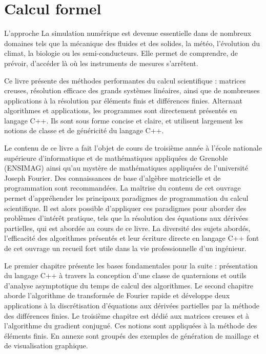 \documentclass[11pt,fleqn]{book} %
\begin{document}
\chapter{Calcul formel}

L'approche La simulation numérique est devenue essentielle dans de nombreux domaines tels que la mécanique des fluides et des solides, la météo, l'évolution du climat, la biologie ou les semi-conducteurs. Elle permet de comprendre, de prévoir, d'accéder là où les instruments de mesures s'arrêtent. 

Ce livre présente des méthodes performantes du calcul scientifique : matrices creuses, résolution efficace des grands systèmes linéaires, ainsi que de nombreuses applications à la résolution par éléments finis et différences finies. Alternant algorithmes et applications, les programmes sont directement présentés en langage C++. Ils sont sous forme concise et claire, et utilisent largement les notions de classe et de généricité du langage C++. 

Le contenu de ce livre a fait l'objet de cours de troisième année à l'école nationale supérieure d'informatique et de mathématiques appliquées de Grenoble (ENSIMAG) ainsi qu'au mystère de mathématiques appliquées de l'université Joseph Fourier. Des connaissances de base d'algèbre matricielle et de programmation sont recommandées. La maîtrise du contenu de cet ouvrage permet d'appréhender les principaux paradigmes de programmation du calcul scientifique. Il est alors possible d'appliquer ces paradigmes pour aborder des problèmes d'intérêt pratique, tels que la résolution des équations aux dérivées partielles, qui est abordée au cours de ce livre. La diversité des sujets abordés, l'efficacité des algorithmes présentés et leur écriture directe en langage C++ font de cet ouvrage un recueil fort utile dans la vie professionnelle d'un ingénieur. 

Le premier chapitre présente les bases fondamentales pour la suite : présentation du langage C++ à travers la conception d'une classe de quaternions et outils d'analyse asymptotique du temps de calcul des algorithmes. Le second chapitre aborde l'algorithme de transformée de Fourier rapide et développe deux applications à la discrétisation d'équations aux dérivées partielles par la méthode des différences finies. Le troisième chapitre est dédié aux matrices creuses et à l'algorithme du gradient conjugué. Ces notions sont appliquées à la méthode des éléments finis. En annexe sont groupés des exemples de génération de maillage et de visualisation graphique. 
\end{document}
